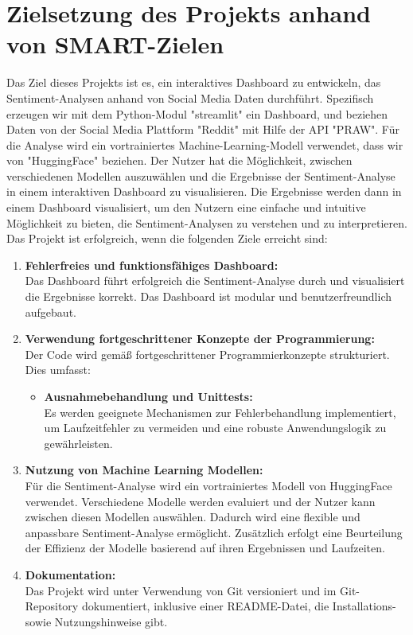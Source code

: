 \sloppy
\section{Zielsetzung des Projekts anhand von SMART-Zielen}
Das Ziel dieses Projekts ist es, ein interaktives Dashboard zu entwickeln, das Sentiment-Analysen anhand von Social Media Daten durchführt.
Spezifisch erzeugen wir mit dem Python-Modul "streamlit" ein Dashboard, und beziehen Daten von der Social Media Plattform "Reddit" mit Hilfe der API "PRAW".
Für die Analyse wird ein vortrainiertes Machine-Learning-Modell verwendet, dass wir von "HuggingFace" beziehen.
Der Nutzer hat die Möglichkeit, zwischen verschiedenen Modellen auszuwählen und die Ergebnisse der Sentiment-Analyse in einem interaktiven Dashboard zu visualisieren. 
Die Ergebnisse werden dann in einem Dashboard visualisiert, um den Nutzern eine einfache und intuitive Möglichkeit zu bieten, die Sentiment-Analysen zu verstehen und zu interpretieren.
\\
Das Projekt ist erfolgreich, wenn die folgenden Ziele erreicht sind:
\begin{enumerate}
    \item \textbf{Fehlerfreies und funktionsfähiges Dashboard: } \\
    Das Dashboard führt erfolgreich die Sentiment-Analyse durch und visualisiert die Ergebnisse korrekt. Das Dashboard ist modular und benutzerfreundlich aufgebaut.
    \item \textbf{Verwendung fortgeschrittener Konzepte der Programmierung:} \\
    Der Code wird gemäß fortgeschrittener Programmierkonzepte strukturiert. Dies umfasst:

    \begin{itemize}
        \item \textbf{Ausnahmebehandlung und Unittests: } \\
        Es werden geeignete Mechanismen zur Fehlerbehandlung implementiert, um Laufzeitfehler zu vermeiden und eine robuste Anwendungslogik zu gewährleisten.
    \end{itemize}
    \newpage

    \item \textbf{Nutzung von Machine Learning Modellen: } \\
    Für die Sentiment-Analyse wird ein vortrainiertes Modell von HuggingFace verwendet.
    Verschiedene Modelle werden evaluiert und der Nutzer kann zwischen diesen Modellen auswählen.
    Dadurch wird eine flexible und anpassbare Sentiment-Analyse ermöglicht.
    Zusätzlich erfolgt eine Beurteilung der Effizienz der Modelle basierend auf ihren Ergebnissen und Laufzeiten.

    \item \textbf{Dokumentation:} \\
    Das Projekt wird unter Verwendung von Git versioniert und im Git-Repository dokumentiert, inklusive einer README-Datei, die Installations- sowie Nutzungshinweise gibt.
\end{enumerate}

